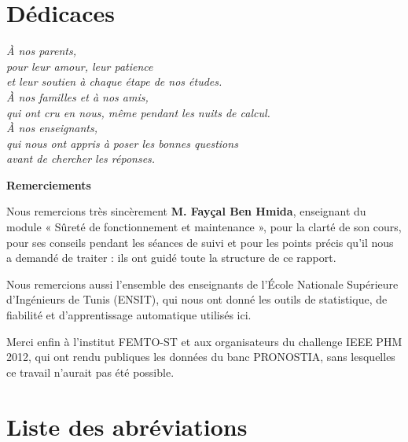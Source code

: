 \chapter*{Dédicaces}

\vspace*{0.3cm}
\begin{center}
\itshape
À nos parents,\\
pour leur amour, leur patience\\
et leur soutien à chaque étape de nos études.\\[1.4em]
À nos familles et à nos amis,\\
qui ont cru en nous, même pendant les nuits de calcul.\\[1.4em]
À nos enseignants,\\
qui nous ont appris à poser les bonnes questions\\
avant de chercher les réponses.
\end{center}

\vspace{1.2cm}
{\normalfont\bfseries\fontsize{24}{28}\selectfont Remerciements\par}
\vspace{0.6cm}

Nous remercions très sincèrement \textbf{M. Fayçal Ben Hmida}, enseignant du module « Sûreté de fonctionnement et maintenance », pour la clarté de son cours, pour ses conseils pendant les séances de suivi et pour les points précis qu'il nous a demandé de traiter : ils ont guidé toute la structure de ce rapport.

Nous remercions aussi l'ensemble des enseignants de l'École Nationale Supérieure d'Ingénieurs de Tunis (ENSIT), qui nous ont donné les outils de statistique, de fiabilité et d'apprentissage automatique utilisés ici.

Merci enfin à l'institut FEMTO-ST et aux organisateurs du challenge IEEE PHM 2012, qui ont rendu publiques les données du banc PRONOSTIA, sans lesquelles ce travail n'aurait pas été possible.

{\small\tableofcontents}

\clearpage{}
{\small
\listoffigures
\begingroup\let\clearpage\relax\vspace{-1.3cm}\listoftables\endgroup
}

\chapter*{Liste des abréviations}

